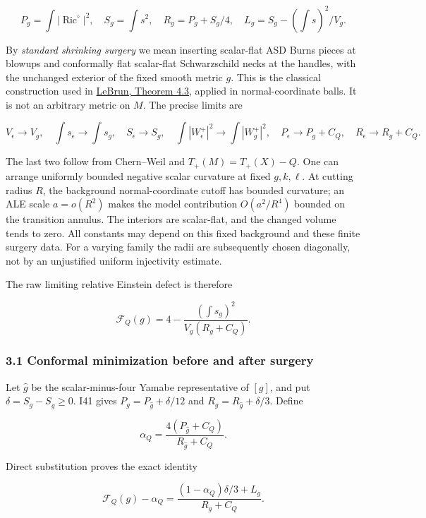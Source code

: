 \documentclass[
  11pt,
]{article}
\begin{document}
\[
 P_g=\int|\operatorname{Ric}^{\circ}|^2,\quad
 S_g=\int s^2,\quad R_g=P_g+S_g/4,
 \quad L_g=S_g-(\int s)^2/V_g.
\]

By \emph{standard shrinking surgery} we mean inserting scalar-flat ASD
Burns pieces at blowups and conformally flat scalar-flat Schwarzschild
necks at the handles, with the unchanged exterior of the fixed smooth
metric \(g\). This is the classical construction used in
\href{https://arxiv.org/html/math/0003068}{LeBrun, Theorem 4.3}, applied
in normal-coordinate balls. It is not an arbitrary metric on \(M\). The
precise limits are

\[
 V_\epsilon\to V_g,\quad \int s_\epsilon\to\int s_g,
 \quad S_\epsilon\to S_g,\quad
 \int|W_\epsilon^+|^2\to\int|W_g^+|^2,
 \quad P_\epsilon\to P_g+C_Q,\quad R_\epsilon\to R_g+C_Q.
 \tag{3.1}
\]

The last two follow from Chern--Weil and \(T_+(M)=T_+(X)-Q\). One can
arrange uniformly bounded negative scalar curvature at fixed
\(g,k,\ell\). At cutting radius \(R\), the background normal-coordinate
cutoff has bounded curvature; an ALE scale \(a=o(R^2)\) makes the model
contribution \(O(a^2/R^4)\) bounded on the transition annulus. The
interiors are scalar-flat, and the changed volume tends to zero. All
constants may depend on this fixed background and these finite surgery
data. For a varying family the radii are subsequently chosen diagonally,
not by an unjustified uniform injectivity estimate.

The raw limiting relative Einstein defect is therefore

\[
 \mathcal F_Q(g)=4-\frac{(\int s_g)^2}{V_g(R_g+C_Q)}.
 \tag{3.2}
\]

\hypertarget{conformal-minimization-before-and-after-surgery}{%
\subsubsection{3.1 Conformal minimization before and after
surgery}\label{conformal-minimization-before-and-after-surgery}}

Let \(\widehat g\) be the scalar-minus-four Yamabe representative of
\([g]\), and put \(\delta=S_g-S_{\widehat g}\ge0\). I41 gives
\(P_g=P_{\widehat g}+\delta/12\) and \(R_g=R_{\widehat g}+\delta/3\).
Define

\[
 \alpha_Q=\frac{4(P_{\widehat g}+C_Q)}{R_{\widehat g}+C_Q}.
\]

Direct substitution proves the exact identity

\[
 \boxed{\mathcal F_Q(g)-\alpha_Q
 =\frac{(1-\alpha_Q)\delta/3+L_g}{R_g+C_Q}.}
 \tag{3.3}
\]
\end{document}
